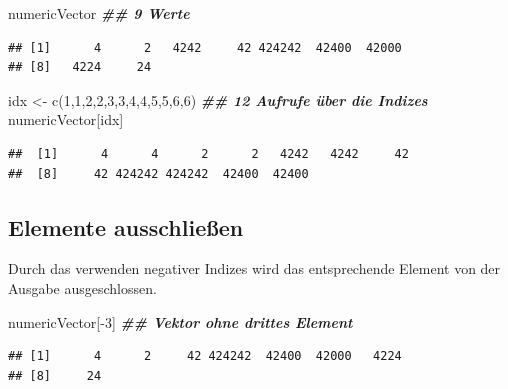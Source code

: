 \documentclass[
]{book}
\newenvironment{Shaded}{\begin{snugshade}}{\end{snugshade}}
\newcommand{\DecValTok}[1]{\textcolor[rgb]{0.00,0.00,0.81}{#1}}
\newcommand{\DocumentationTok}[1]{\textcolor[rgb]{0.56,0.35,0.01}{\textbf{\textit{#1}}}}
\newcommand{\FunctionTok}[1]{\textcolor[rgb]{0.00,0.00,0.00}{#1}}
\newcommand{\NormalTok}[1]{#1}
\newcommand{\OtherTok}[1]{\textcolor[rgb]{0.56,0.35,0.01}{#1}}
\newcommand{\SpecialCharTok}[1]{\textcolor[rgb]{0.00,0.00,0.00}{#1}}
\begin{document}
\begin{Shaded}
\begin{Highlighting}[]
\NormalTok{numericVector }\DocumentationTok{\#\# 9 Werte}
\end{Highlighting}
\end{Shaded}

\begin{verbatim}
## [1]      4      2   4242     42 424242  42400  42000
## [8]   4224     24
\end{verbatim}

\begin{Shaded}
\begin{Highlighting}[]
\NormalTok{idx }\OtherTok{\textless{}{-}} \FunctionTok{c}\NormalTok{(}\DecValTok{1}\NormalTok{,}\DecValTok{1}\NormalTok{,}\DecValTok{2}\NormalTok{,}\DecValTok{2}\NormalTok{,}\DecValTok{3}\NormalTok{,}\DecValTok{3}\NormalTok{,}\DecValTok{4}\NormalTok{,}\DecValTok{4}\NormalTok{,}\DecValTok{5}\NormalTok{,}\DecValTok{5}\NormalTok{,}\DecValTok{6}\NormalTok{,}\DecValTok{6}\NormalTok{)}
\DocumentationTok{\#\# 12 Aufrufe über die Indizes}
\NormalTok{numericVector[idx]}
\end{Highlighting}
\end{Shaded}

\begin{verbatim}
##  [1]      4      4      2      2   4242   4242     42
##  [8]     42 424242 424242  42400  42400
\end{verbatim}

\hypertarget{elemente-ausschlieuxdfen}{%
\subsection{Elemente ausschließen}\label{elemente-ausschlieuxdfen}}

Durch das verwenden negativer Indizes wird das entsprechende Element von der Ausgabe ausgeschlossen.

\begin{Shaded}
\begin{Highlighting}[]
\NormalTok{numericVector[}\SpecialCharTok{{-}}\DecValTok{3}\NormalTok{] }\DocumentationTok{\#\# Vektor ohne drittes Element}
\end{Highlighting}
\end{Shaded}

\begin{verbatim}
## [1]      4      2     42 424242  42400  42000   4224
## [8]     24
\end{verbatim}
\end{document}
